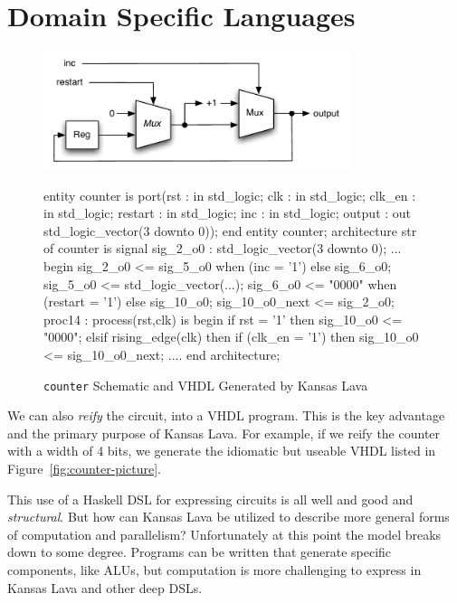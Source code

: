 \documentclass[11pt]{article}
\begin{document}
\section{Domain Specific Languages}






\begin{figure}[!t]
  \centering
  \begin{minipage}{0.5\textwidth}
    \centering
    \includegraphics[width=0.8\textwidth]{images/Counter.pdf}
  \end{minipage}\begin{minipage}{0.5\textwidth}
     \centering
\footnotesize\begin{Code}[fontsize=\tiny]
entity counter is
  port(rst : in std_logic;
       clk : in std_logic;
       clk_en : in std_logic;
       restart : in std_logic;
       inc : in std_logic;
       output : out std_logic_vector(3 downto 0));
end entity counter;
architecture str of counter is
  signal sig_2_o0 : std_logic_vector(3 downto 0);
  ...
begin
  sig_2_o0 <= sig_5_o0 when (inc = '1')  else sig_6_o0;
  sig_5_o0 <= std_logic_vector(...);
  sig_6_o0 <= "0000" when (restart = '1') else sig_10_o0;
  sig_10_o0_next <= sig_2_o0;
  proc14 : process(rst,clk) is
  begin
    if rst = '1' then
      sig_10_o0 <= "0000";
    elsif rising_edge(clk) then
      if (clk_en = '1') then
        sig_10_o0 <= sig_10_o0_next;
  ....
end architecture;
\end{Code}
  \end{minipage}
  \caption{{\tt counter} Schematic and VHDL Generated by Kansas Lava}
  \label{fig:counter-pictureX}
\end{figure}

We can also {\em reify\/} the circuit, into
a VHDL program. This is the key advantage and the
primary purpose of Kansas Lava. For example,
if we reify the counter with a width of 4 bits, we generate
the idiomatic but useable VHDL
listed in Figure~\ref{fig:counter-picture}.

This use of a Haskell DSL for expressing circuits
is all well and good and {\em structural\/}.
But how can Kansas Lava be utilized to
describe more general forms of computation and parallelism?
Unfortunately at this point the model breaks down
to some degree. Programs can be written
that generate specific components, like ALUs,
but computation is more challenging to express
in Kansas Lava and other deep DSLs.
\end{document}
